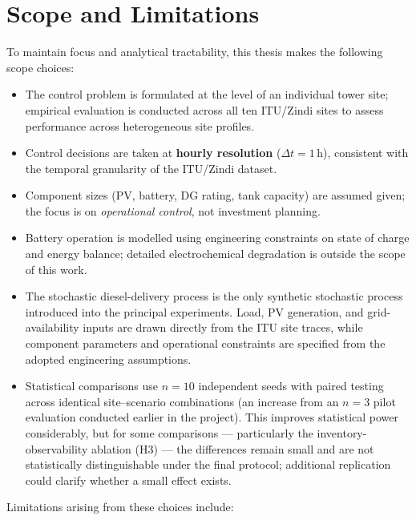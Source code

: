 \section{Scope and Limitations}

To maintain focus and analytical tractability, this thesis makes the following
scope choices:

\begin{itemize}
  \item The control problem is formulated at the level of an individual tower
  site; empirical evaluation is conducted across all ten ITU/Zindi sites to
  assess performance across heterogeneous site profiles.
  \item Control decisions are taken at \textbf{hourly resolution}
  ($\Delta t = 1$\,h), consistent with the temporal granularity of the
  ITU/Zindi dataset.
  \item Component sizes (PV, battery, DG rating, tank capacity) are assumed
  given; the focus is on \emph{operational control}, not investment planning.
  \item Battery operation is modelled using engineering constraints on
  state of charge and energy balance; detailed electrochemical
  degradation is outside the scope of this work.
  \item The stochastic diesel-delivery process is the only synthetic stochastic
process introduced into the principal experiments. Load, PV generation, and grid-availability inputs
  are drawn directly from the ITU site traces, while component parameters
  and operational constraints are specified from the adopted engineering
  assumptions.
  \item Statistical comparisons use $n = 10$ independent seeds with paired
  testing across identical site--scenario combinations (an increase from
  an $n=3$ pilot evaluation conducted earlier in the project). This
  improves statistical power considerably, but for some comparisons ---
  particularly the inventory-observability ablation (H3) --- the
  differences remain small and are not statistically distinguishable
  under the final protocol; additional replication could clarify whether
  a small effect exists.
\end{itemize}

Limitations arising from these choices include:

